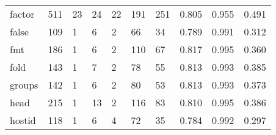 \begin{longtable}{lp{2.0cm}p{2.0cm}p{2.0cm}p{2.0cm}p{2.0cm}p{2.0cm}p{2.0cm}p{2.0cm}p{2.0cm}}
factor    &                    511 &                                 23 &                                24 &                               22 &                               191 &                             251 &                                   0.805 &                                  0.955 &                                0.491 \\
false     &                    109 &                                  1 &                                 6 &                                2 &                                66 &                              34 &                                   0.789 &                                  0.991 &                                0.312 \\
fmt       &                    186 &                                  1 &                                 6 &                                2 &                               110 &                              67 &                                   0.817 &                                  0.995 &                                0.360 \\
fold      &                    143 &                                  1 &                                 7 &                                2 &                                78 &                              55 &                                   0.813 &                                  0.993 &                                0.385 \\
groups    &                    142 &                                  1 &                                 6 &                                2 &                                80 &                              53 &                                   0.813 &                                  0.993 &                                0.373 \\
head      &                    215 &                                  1 &                                13 &                                2 &                               116 &                              83 &                                   0.810 &                                  0.995 &                                0.386 \\
hostid    &                    118 &                                  1 &                                 6 &                                4 &                                72 &                              35 &                                   0.784 &                                  0.992 &                                0.297 \\

\end{longtable}
